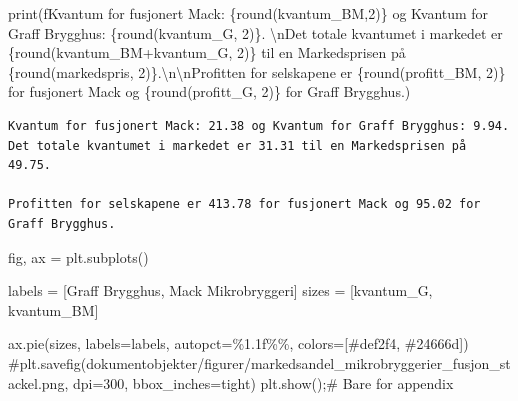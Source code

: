 \documentclass[
  12pt,
  a4paper,
  DIV=11,
  numbers=noendperiod]{scrartcl}
\newenvironment{Shaded}{\begin{snugshade}}{\end{snugshade}}
\newcommand{\BuiltInTok}[1]{\textcolor[rgb]{0.00,0.23,0.31}{#1}}
\newcommand{\CharTok}[1]{\textcolor[rgb]{0.13,0.47,0.30}{#1}}
\newcommand{\CommentTok}[1]{\textcolor[rgb]{0.37,0.37,0.37}{#1}}
\newcommand{\DecValTok}[1]{\textcolor[rgb]{0.68,0.00,0.00}{#1}}
\newcommand{\NormalTok}[1]{\textcolor[rgb]{0.00,0.23,0.31}{#1}}
\newcommand{\OperatorTok}[1]{\textcolor[rgb]{0.37,0.37,0.37}{#1}}
\newcommand{\SpecialCharTok}[1]{\textcolor[rgb]{0.37,0.37,0.37}{#1}}
\newcommand{\SpecialStringTok}[1]{\textcolor[rgb]{0.13,0.47,0.30}{#1}}
\newcommand{\StringTok}[1]{\textcolor[rgb]{0.13,0.47,0.30}{#1}}
\begin{document}
\begin{Shaded}
\begin{Highlighting}[]
\BuiltInTok{print}\NormalTok{(}\SpecialStringTok{f\textquotesingle{}\textquotesingle{}\textquotesingle{}Kvantum for fusjonert Mack: }\SpecialCharTok{\{}\BuiltInTok{round}\NormalTok{(kvantum\_BM,}\DecValTok{2}\NormalTok{)}\SpecialCharTok{\}}\SpecialStringTok{ og Kvantum for Graff Brygghus: }\SpecialCharTok{\{}\BuiltInTok{round}\NormalTok{(kvantum\_G, }\DecValTok{2}\NormalTok{)}\SpecialCharTok{\}}\SpecialStringTok{. }\CharTok{\textbackslash{}n}\SpecialStringTok{Det totale kvantumet i markedet er }\SpecialCharTok{\{}\BuiltInTok{round}\NormalTok{(kvantum\_BM}\OperatorTok{+}\NormalTok{kvantum\_G, }\DecValTok{2}\NormalTok{)}\SpecialCharTok{\}}\SpecialStringTok{ til en Markedsprisen på }\SpecialCharTok{\{}\BuiltInTok{round}\NormalTok{(markedspris, }\DecValTok{2}\NormalTok{)}\SpecialCharTok{\}}\SpecialStringTok{.}\CharTok{\textbackslash{}n\textbackslash{}n}\SpecialStringTok{Profitten for selskapene er }\SpecialCharTok{\{}\BuiltInTok{round}\NormalTok{(profitt\_BM, }\DecValTok{2}\NormalTok{)}\SpecialCharTok{\}}\SpecialStringTok{ for fusjonert Mack og }\SpecialCharTok{\{}\BuiltInTok{round}\NormalTok{(profitt\_G, }\DecValTok{2}\NormalTok{)}\SpecialCharTok{\}}\SpecialStringTok{ for Graff Brygghus.\textquotesingle{}\textquotesingle{}\textquotesingle{}}\NormalTok{)}
\end{Highlighting}
\end{Shaded}

\begin{verbatim}
Kvantum for fusjonert Mack: 21.38 og Kvantum for Graff Brygghus: 9.94. 
Det totale kvantumet i markedet er 31.31 til en Markedsprisen på 49.75.

Profitten for selskapene er 413.78 for fusjonert Mack og 95.02 for Graff Brygghus.
\end{verbatim}

\begin{Shaded}
\begin{Highlighting}[]
\NormalTok{fig, ax }\OperatorTok{=}\NormalTok{ plt.subplots()}

\NormalTok{labels }\OperatorTok{=}\NormalTok{ [}\StringTok{\textquotesingle{}Graff Brygghus\textquotesingle{}}\NormalTok{, }\StringTok{\textquotesingle{}Mack Mikrobryggeri\textquotesingle{}}\NormalTok{]}
\NormalTok{sizes }\OperatorTok{=}\NormalTok{ [kvantum\_G, kvantum\_BM]}

\NormalTok{ax.pie(sizes, labels}\OperatorTok{=}\NormalTok{labels, autopct}\OperatorTok{=}\StringTok{\textquotesingle{}}\SpecialCharTok{\%1.1f\%\%}\StringTok{\textquotesingle{}}\NormalTok{, colors}\OperatorTok{=}\NormalTok{[}\StringTok{\textquotesingle{}\#def2f4\textquotesingle{}}\NormalTok{, }\StringTok{\textquotesingle{}\#24666d\textquotesingle{}}\NormalTok{])}
\CommentTok{\#plt.savefig(\textquotesingle{}dokumentobjekter/figurer/markedsandel\_mikrobryggerier\_fusjon\_stackel.png\textquotesingle{}, dpi=300, bbox\_inches=\textquotesingle{}tight\textquotesingle{})}
\NormalTok{plt.show()}\OperatorTok{;}\CommentTok{\# Bare for appendix}
\end{Highlighting}
\end{Shaded}
\end{document}
